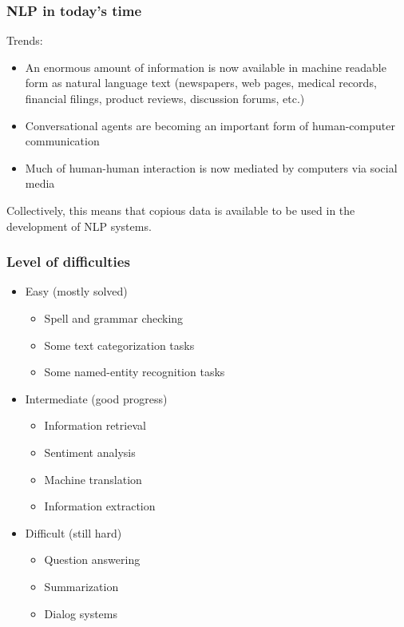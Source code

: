 \begin{frame}[fragile]\frametitle{NLP in today's time}
Trends:
	\begin{itemize}
	\item An enormous amount of information is now available in machine readable form as natural language text (newspapers, web pages, medical records, financial filings, product reviews, discussion forums, etc.)
	\item Conversational agents are becoming an important form of human-computer communication
	\item Much of human-human interaction is now mediated by computers via social media
	\end{itemize}
Collectively, this means that copious data is available to be used in the development of NLP systems.

\end{frame}
\begin{frame}[fragile]\frametitle{Level of difficulties}

	\begin{itemize}
	\item Easy (mostly solved)
		\begin{itemize}
		\item Spell and grammar checking
		\item Some text categorization tasks
		\item Some named-entity recognition tasks
		\end{itemize}
	\item Intermediate (good progress)
		\begin{itemize}
		\item Information retrieval
		\item Sentiment analysis
		\item Machine translation
		\item Information extraction
		\end{itemize}	
	\item Difficult (still hard)
		\begin{itemize}
		\item Question answering
		\item Summarization
		\item Dialog systems
		\end{itemize}	
	\end{itemize}

\end{frame}


